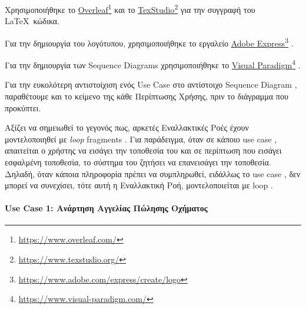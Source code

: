 \documentclass{../ol-softwaremanual}
\newcommand{\doclink}[2]{\href{#1}{#2}\footnote{\url{#1}}}
\begin{document}
	\vspace{20pt}
	\flushleft
	Χρησιμοποιήθηκε το \en \doclink{https://www.overleaf.com/}{Overleaf} \gr και το \en \doclink{https://www.texstudio.org/}{TexStudio} \gr για την συγγραφή του \LaTeX\ κώδικα. \break
	
	Για την δημιουργία του λογότυπου, χρησιμοποιήθηκε το εργαλείο \en \doclink{https://www.adobe.com/express/create/logo}{Adobe Express} . \gr \break
	
	Για την δημιουργία των \en Sequence Diagrams \gr χρησιμοποιήθηκε το \en \doclink{https://www.visual-paradigm.com/}{Visual Paradigm} . \gr \break 
	
	\newpage
	
	\flushleft
	
	
	Για την ευκολότερη αντιστοίχιση ενός \en Use Case \gr στο αντίστοιχο \en Sequence Diagram \gr, παραθέτουμε και το κείμενο της κάθε Περίπτωσης Χρήσης, πριν το διάγραμμα που προκύπτει. \break
	
	Αξίζει να σημειωθεί το γεγονός πως, αρκετές Εναλλακτικές Ροές έχουν μοντελοποιηθεί με \en \textit{loop} fragments \gr. Για παράδειγμα, όταν σε κάποιο \en use case \gr, απαιτείται ο χρήστης να εισάγει την τοποθεσία του και σε περίπτωση που εισάγει εσφαλμένη τοποθεσία, το σύστημα του ζητήσει να επανεισάγει την τοποθεσία. Δηλαδή, όταν κάποια πληροφορία πρέπει να συμπληρωθεί, ειδάλλως το \en use case \gr, δεν μπορεί να συνεχίσει, τότε αυτή η Εναλλακτική Ροή, μοντελοποιείται με \en loop \gr.
	
	
	\newpage
	
	\paragraph{\en Use Case 1: \gr Ανάρτηση Αγγελίας Πώλησης Οχήματος}
	\centering
	
\end{document}
